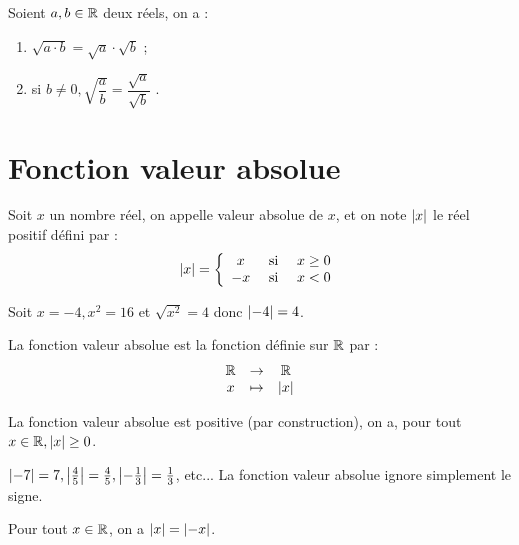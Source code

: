 \documentclass[a4paper, 12pt]{report}
\begin{document}
\begin{thm}
	Soient $a, b \in\R$ deux réels, on a :
		\begin{enumerate}[label=(\roman*)]
			\item $\sqrt{a \cdot b} = \sqrt{a} \cdot \sqrt{b}$ ;
			\item si $b \neq 0, \sqrt{\dfrac{a}{b}} = \dfrac{\sqrt{a}}{\sqrt{b}}$ .
		\end{enumerate}
\end{thm}

\section{Fonction valeur absolue}

\begin{defn}
Soit $x$ un nombre réel, on appelle valeur absolue de $x$, et on note $\abs{x}$ le réel positif défini par :
\[ \abs{x} = \left \{ \begin{array}{c c c} 
			x & \text{ si } & x \geq 0 \\ 
			-x & \text{ si } & x < 0 
			\end{array} \right. \]
\end{defn}

\begin{ex}
Soit $x = -4, x^2 = 16$ et $\sqrt{x^2} = 4$ donc $\abs{-4} = 4$.
\end{ex}

\begin{defn}
La fonction valeur absolue est la fonction définie sur $\R$ par :
\[ \begin{array}{c c c}
\R & \to & \R \\
x & \mapsto & \abs{x} 
\end{array} \]
\end{defn}

\begin{prop}[Positivité]
La fonction valeur absolue est positive (par construction), on a, pour tout $x \in \R, \abs{x} \geq 0$.
\end{prop}

\begin{ex}
$\abs{-7} = 7, \abs*{\frac45} = \frac45, \abs*{-\frac13} = \frac13$, etc... \newline
La fonction valeur absolue \og ignore \fg simplement le signe.
\end{ex}

\begin{coro}[Symétrie]
Pour tout $x \in \R$, on a $\abs{x} = \abs{-x}$.
\end{coro}
\end{document}
